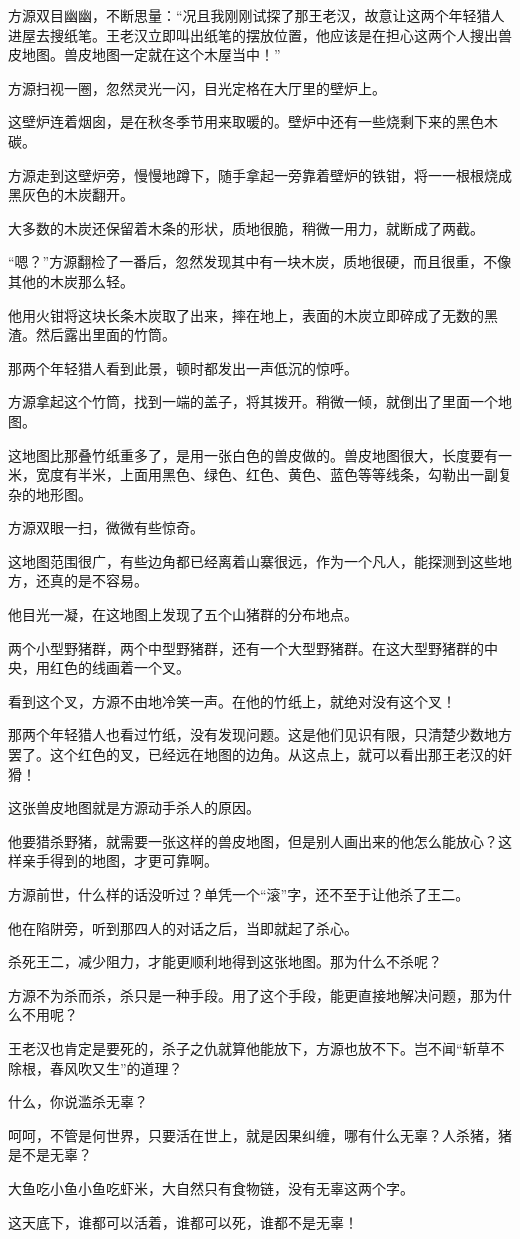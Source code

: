 \begin{this_body}
方源双目幽幽，不断思量：“况且我刚刚试探了那王老汉，故意让这两个年轻猎人进屋去搜纸笔。王老汉立即叫出纸笔的摆放位置，他应该是在担心这两个人搜出兽皮地图。兽皮地图一定就在这个木屋当中！”

方源扫视一圈，忽然灵光一闪，目光定格在大厅里的壁炉上。

这壁炉连着烟囱，是在秋冬季节用来取暖的。壁炉中还有一些烧剩下来的黑色木碳。

方源走到这壁炉旁，慢慢地蹲下，随手拿起一旁靠着壁炉的铁钳，将一一根根烧成黑灰色的木炭翻开。

大多数的木炭还保留着木条的形状，质地很脆，稍微一用力，就断成了两截。

“嗯？”方源翻检了一番后，忽然发现其中有一块木炭，质地很硬，而且很重，不像其他的木炭那么轻。

他用火钳将这块长条木炭取了出来，摔在地上，表面的木炭立即碎成了无数的黑渣。然后露出里面的竹筒。

那两个年轻猎人看到此景，顿时都发出一声低沉的惊呼。

方源拿起这个竹筒，找到一端的盖子，将其拨开。稍微一倾，就倒出了里面一个地图。

这地图比那叠竹纸重多了，是用一张白色的兽皮做的。兽皮地图很大，长度要有一米，宽度有半米，上面用黑色、绿色、红色、黄色、蓝色等等线条，勾勒出一副复杂的地形图。

方源双眼一扫，微微有些惊奇。

这地图范围很广，有些边角都已经离着山寨很远，作为一个凡人，能探测到这些地方，还真的是不容易。

他目光一凝，在这地图上发现了五个山猪群的分布地点。

两个小型野猪群，两个中型野猪群，还有一个大型野猪群。在这大型野猪群的中央，用红色的线画着一个叉。

看到这个叉，方源不由地冷笑一声。在他的竹纸上，就绝对没有这个叉！

那两个年轻猎人也看过竹纸，没有发现问题。这是他们见识有限，只清楚少数地方罢了。这个红色的叉，已经远在地图的边角。从这点上，就可以看出那王老汉的奸猾！

这张兽皮地图就是方源动手杀人的原因。

他要猎杀野猪，就需要一张这样的兽皮地图，但是别人画出来的他怎么能放心？这样亲手得到的地图，才更可靠啊。

方源前世，什么样的话没听过？单凭一个“滚”字，还不至于让他杀了王二。

他在陷阱旁，听到那四人的对话之后，当即就起了杀心。

杀死王二，减少阻力，才能更顺利地得到这张地图。那为什么不杀呢？

方源不为杀而杀，杀只是一种手段。用了这个手段，能更直接地解决问题，那为什么不用呢？

王老汉也肯定是要死的，杀子之仇就算他能放下，方源也放不下。岂不闻“斩草不除根，春风吹又生”的道理？

什么，你说滥杀无辜？

呵呵，不管是何世界，只要活在世上，就是因果纠缠，哪有什么无辜？人杀猪，猪是不是无辜？

大鱼吃小鱼小鱼吃虾米，大自然只有食物链，没有无辜这两个字。

这天底下，谁都可以活着，谁都可以死，谁都不是无辜！

\end{this_body}

